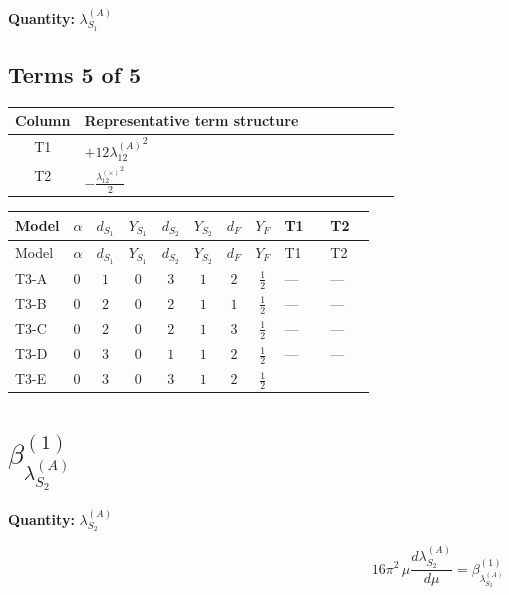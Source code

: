 \documentclass[8pt]{article}
\begin{document}
\begin{landscape}
\begin{longtable}{@{}llcccccc >{\raggedright\arraybackslash}p{0.21\linewidth} >{\raggedright\arraybackslash}p{0.21\linewidth} >{\raggedright\arraybackslash}p{0.21\linewidth}@{}}
\midrule
\bottomrule
\end{longtable}
\clearpage
\noindent\textbf{Quantity: }$\lambda_{S_1}^{(A)}$\par\smallskip
\subsection*{Terms 5 of 5}
\begin{center}
\begin{tabular}{@{}c >{\raggedright\arraybackslash}p{0.82\linewidth}@{}}
\toprule
Column & Representative term structure \\
\midrule
T1 & \(\displaystyle +12 {\lambda_{12}^{(A)}}^2\) \\
\midrule
T2 & \(\displaystyle -\frac{{\lambda_{12}^{(\times)}}^2}{2}\) \\
\midrule
\bottomrule
\end{tabular}
\end{center}
\smallskip
\tiny
\begin{longtable}{@{}llcccccc >{\raggedright\arraybackslash}p{0.21\linewidth} >{\raggedright\arraybackslash}p{0.21\linewidth}@{}}
\toprule
Model & $\alpha$ & $d_{S_1}$ & $Y_{S_1}$ & $d_{S_2}$ & $Y_{S_2}$ & $d_F$ & $Y_F$ & T1 & T2 \\
\midrule
\endfirsthead
\toprule
Model & $\alpha$ & $d_{S_1}$ & $Y_{S_1}$ & $d_{S_2}$ & $Y_{S_2}$ & $d_F$ & $Y_F$ & T1 & T2 \\
\midrule
\endhead
T3-A & $0$ & $1$ & $0$ & $3$ & $1$ & $2$ & $\frac{1}{2}$ & --- & --- \\
\midrule
T3-B & $0$ & $2$ & $0$ & $2$ & $1$ & $1$ & $\frac{1}{2}$ & --- & --- \\
\midrule
T3-C & $0$ & $2$ & $0$ & $2$ & $1$ & $3$ & $\frac{1}{2}$ & --- & --- \\
\midrule
T3-D & $0$ & $3$ & $0$ & $1$ & $1$ & $2$ & $\frac{1}{2}$ & --- & --- \\
\midrule
T3-E & $0$ & $3$ & $0$ & $3$ & $1$ & $2$ & $\frac{1}{2}$ & \scriptsize\adjustbox{max width=\linewidth}{$\begin{gathered} +12 {\lambda_{12}^{(A)}}^2\end{gathered}$} & \scriptsize\adjustbox{max width=\linewidth}{$\begin{gathered} -\frac{{\lambda_{12}^{(\times)}}^2}{2}\end{gathered}$} \\
\midrule
\bottomrule
\end{longtable}
\clearpage
\section*{$\beta_{\lambda_{S_2}^{(A)}}^{(1)}$}
\noindent\textbf{Quantity: }$\lambda_{S_2}^{(A)}$\par\smallskip
\[16\pi^2\,\mu\frac{d \lambda_{S_2}^{(A)}}{d\mu}=\beta_{\lambda_{S_2}^{(A)}}^{(1)}\]

\end{landscape}
\end{document}
